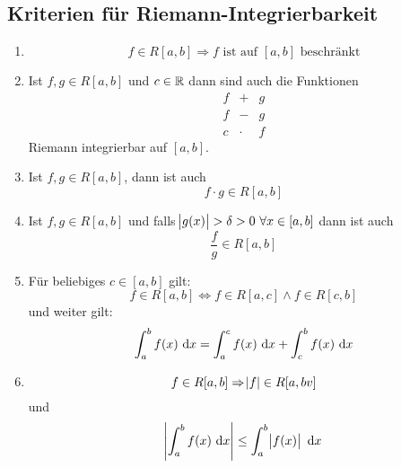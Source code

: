 \subsection{Kriterien für Riemann-Integrierbarkeit}
\begin{enumerate}[label= (\alph*)]
    \item
        \begin{equation*}
            f \in R[a, b] \Rightarrow f \text{ ist auf } [a,b] \text{ beschränkt}
        \end{equation*}
    \item Ist $f, g \in R [a, b]$ und $c \in \mathbb{R}$ dann sind auch die Funktionen
        \begin{eqnarray*}
            f&+&g\\
            f&-&g\\
            c &\cdot& f
        \end{eqnarray*}
        Riemann integrierbar auf $[a, b]$.
    \item Ist $f, g \in R[a, b]$, dann ist auch
        \begin{equation*}
            f \cdot g \in R[a, b]
        \end{equation*}
    \item Ist $f, g \in R[a, b]$ und falls
        $\abs{g(x)} > \delta > 0\ \forall x \in [a, b]$ dann ist auch
        \begin{equation*}
            \frac{f}{g} \in R[a, b]
        \end{equation*}
    \item Für beliebiges $c \in [a, b]$  gilt:
        \begin{equation*}
            f \in R[a, b] \Leftrightarrow f \in R[a, c] \land f \in R[c, b]
        \end{equation*}
        und weiter gilt:
        \begin{equation*}
            \int_a^b f(x) \text{ d}x = \int_a^c f(x) \text{ d}x + \int_c^b f(x) \text{ d}x
        \end{equation*}
    \item
        \begin{equation*}
        f \in R[a, b] \Rightarrow \abs{f} \in R[a, bv]
        \end{equation*}
        und
        \begin{equation*}
            \abs{\int_a^b f(x)\text{ d}x} \leq \int_a^b \abs{f(x)} \text{ d}x
        \end{equation*}
\end{enumerate}

